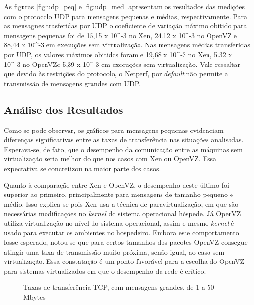 \documentclass[12pt]{article}
\begin{document}
As figuras \ref{fig:udp_peq} e  \ref{fig:udp_med} apresentam os resultados das medições com o protocolo UDP para mensagens pequenas e médias, respectivamente. Para as mensagnes trasferidas por UDP o coeficiente de variação máximo obitido para mensagens pequenas foi de 15,15 x 10^{-3} no Xen, 24.12 x 10^{-3} no OpenVZ e 88,44 x 10^{-3} em execuções sem virtualização. Nas mensagens médias transferidas por UDP, os valores máximos obitidos foram  e 19,68 x 10^{-3} no Xen, 5.32  x 10^{-3} no OpenVZe 5,39 x 10^{-3} em execuções sem virtualizaçào. Vale ressaltar que devido às restrições do protocolo, o Netperf, por \emph{default} não permite a transmissão de mensagens grandes com UDP.


\subsection{Análise dos Resultados}

Como se pode observar, os gráficos para mensagens pequenas evidenciam diferenças significativas entre as taxas de transferência nas situações analisadas. Esperava-se, de fato, que o desempenho da comunicação entre as máquinas sem virtualização seria melhor do que nos casos com Xen ou OpenVZ. Essa expectativa se concretizou na maior parte dos casos.

Quanto à comparação entre Xen e OpenVZ, o desempenho deste último foi superior ao primeiro, principalmente para mensagens de tamanho pequeno e médio. Isso explica-se pois Xen usa a técnica de paravirtualização, em que são necessárias modificações no \emph{kernel} do sistema operacional hóspede. Já OpenVZ utiliza virtualização no nível do sistema operacional, assim o mesmo \emph{kernel} é usado para executar os ambientes no hospedeiro. Embora este comportamento fosse esperado, notou-se que para certos tamanhos dos pacotes OpenVZ consegue atingir uma taxa de transmissão muito próxima, senão igual, ao caso sem virtualização. Essa constatação é um ponto favorável para a escolha do OpenVZ para sistemas virtualizados em que o desempenho da rede é crítico.

\begin{figure}[!htb]
\centering
{}
\caption{Taxas de transferência TCP, com mensagens grandes, de 1 a 50 Mbytes}
\label{fig:tcp_grande}
\end{figure}
\end{document}
